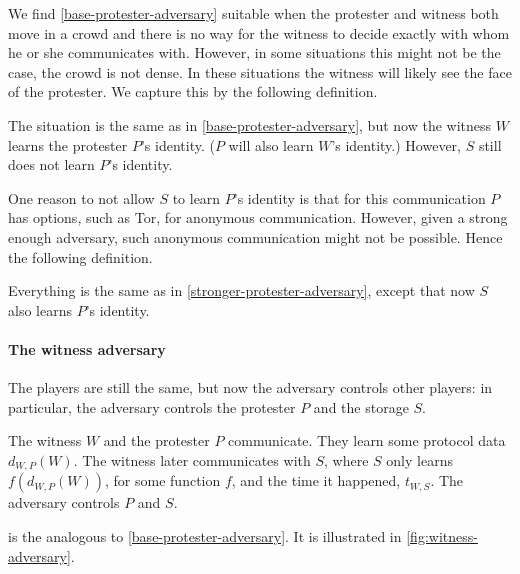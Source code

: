 We find \cref{base-protester-adversary} suitable when the protester and witness 
both move in a crowd and there is no way for the witness to decide exactly with 
whom he or she communicates with.
However, in some situations this might not be the case, \eg the crowd is not 
dense.
In these situations the witness will likely see the face of the protester.
We capture this by the following definition.

\begin{definition}%
  \label{stronger-protester-adversary}
  The situation is the same as in \cref{base-protester-adversary}, but now the 
  witness \(W\) learns the protester \(P\)'s identity.
  (\(P\) will also learn \(W\)'s identity.)
  However, \(S\) still does not learn \(P\)'s identity.
\end{definition}

One reason to not allow \(S\) to learn \(P\)'s identity is that for this 
communication \(P\) has options, such as \ac{Tor}, for anonymous communication.
However, given a strong enough adversary, such anonymous communication might 
not be possible.
Hence the following definition.

\begin{definition}%
  \label{strongest-protester-adversary}
  Everything is the same as in \cref{stronger-protester-adversary}, except that 
  now \(S\) also learns \(P\)'s identity.
\end{definition}

\paragraph{The witness adversary}

The players are still the same, but now the adversary controls other players: 
in particular, the adversary controls the protester \(P\) and the storage 
\(S\).

\begin{definition}\label{base-witness-adversary}
  The witness \(W\) and the protester \(P\) communicate.
  They learn some protocol data \(d_{W,P}(W)\).
  The witness later communicates with \(S\), where \(S\) only learns 
  \(f(d_{W,P}(W))\), for some function \(f\), and the time it happened, 
  \(t_{W,S}\).
  The adversary controls \(P\) and \(S\).
\end{definition}

 is the analogous to 
\cref{base-protester-adversary}.
It is illustrated in \cref{fig:witness-adversary}.

